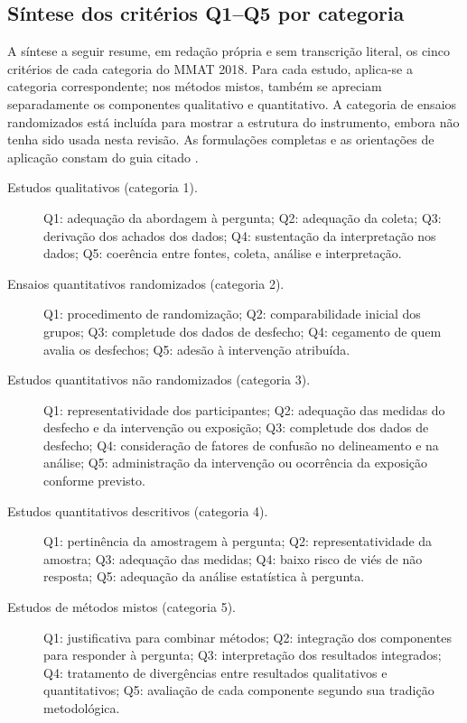 \begin{apendicesenv}
\section{Síntese dos critérios Q1--Q5 por categoria}
\label{apendice:mmat-criterios}

A síntese a seguir resume, em redação própria e sem transcrição literal, os cinco critérios de cada categoria do MMAT 2018. Para cada estudo, aplica-se a categoria correspondente; nos métodos mistos, também se apreciam separadamente os componentes qualitativo e quantitativo. A categoria de ensaios randomizados está incluída para mostrar a estrutura do instrumento, embora não tenha sido usada nesta revisão. As formulações completas e as orientações de aplicação constam do guia citado \cite{MMATGuide2018}.

\begin{description}
\item[Estudos qualitativos (categoria 1).] Q1: adequação da abordagem à pergunta; Q2: adequação da coleta; Q3: derivação dos achados dos dados; Q4: sustentação da interpretação nos dados; Q5: coerência entre fontes, coleta, análise e interpretação.

\item[Ensaios quantitativos randomizados (categoria 2).] Q1: procedimento de randomização; Q2: comparabilidade inicial dos grupos; Q3: completude dos dados de desfecho; Q4: cegamento de quem avalia os desfechos; Q5: adesão à intervenção atribuída.

\item[Estudos quantitativos não randomizados (categoria 3).] Q1: representatividade dos participantes; Q2: adequação das medidas do desfecho e da intervenção ou exposição; Q3: completude dos dados de desfecho; Q4: consideração de fatores de confusão no delineamento e na análise; Q5: administração da intervenção ou ocorrência da exposição conforme previsto.

\item[Estudos quantitativos descritivos (categoria 4).] Q1: pertinência da amostragem à pergunta; Q2: representatividade da amostra; Q3: adequação das medidas; Q4: baixo risco de viés de não resposta; Q5: adequação da análise estatística à pergunta.

\item[Estudos de métodos mistos (categoria 5).] Q1: justificativa para combinar métodos; Q2: integração dos componentes para responder à pergunta; Q3: interpretação dos resultados integrados; Q4: tratamento de divergências entre resultados qualitativos e quantitativos; Q5: avaliação de cada componente segundo sua tradição metodológica.
\end{description}


\end{apendicesenv}
